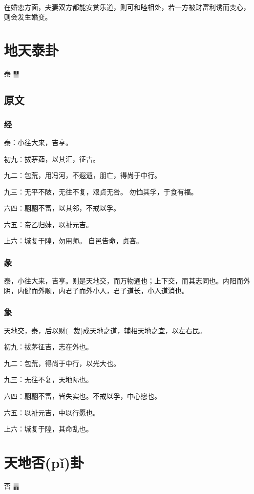 \documentclass[12pt,oneside]{book}
\begin{document}
在婚恋方面，夫妻双方都能安贫乐道，则可和睦相处，若一方被财富利诱而变心，则会发生婚变。



\chapter{地天泰卦}
泰 {\Large ䷊}

\section{原文}

\subsection{经}
泰：小往大来，吉亨。

初九：拔茅茹，以其汇，征吉。

九二：包荒，用冯河，不遐遗，朋亡，得尚于中行。

九三：无平不陂，无往不复，艰贞无咎。 勿恤其孚，于食有福。

六四：翩翩不富，以其邻，不戒以孚。

六五：帝乙归妹，以祉元吉。

上六：城复于隍，勿用师。 自邑告命，贞吝。

\subsection{彖}
泰，小往大来，吉亨。则是天地交，而万物通也；上下交，而其志同也。内阳而外阴，内健而外顺，内君子而外小人，君子道长，小人道消也。

\subsection{象}
天地交，泰，后以财(=裁)成天地之道，辅相天地之宜，以左右民。

初九：拔茅征吉，志在外也。

九二：包荒，得尚于中行，以光大也。

九三：无往不复，天地际也。

六四：翩翩不富，皆失实也。不戒以孚，中心愿也。

六五：以祉元吉，中以行愿也。

上六：城复于隍，其命乱也。


\chapter{天地否(pǐ)卦}
否 {\Large ䷋}
\end{document}
